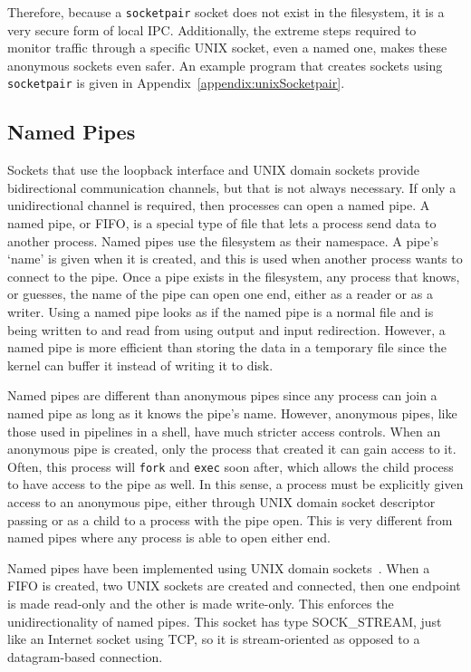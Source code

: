 Therefore, because a \texttt{socketpair} socket does not exist in the filesystem, it is a very secure form of local IPC.  Additionally, the extreme steps required to monitor traffic through a specific UNIX socket, even a named one, makes these anonymous sockets even safer.  An example program that creates sockets using \texttt{socketpair} is given in Appendix~\ref{appendix:unixSocketpair}.

\subsection{Named Pipes}
\label{sec:namedPipes}
Sockets that use the loopback interface and UNIX domain sockets provide bidirectional communication channels, but that is not always necessary.  If only a unidirectional channel is required, then processes can open a named pipe.  A named pipe, or FIFO, is a special type of file that lets a process send data to another process.  Named pipes use the filesystem as their namespace.  A pipe's `name' is given when it is created, and this is used when another process wants to connect to the pipe.  Once a pipe exists in the filesystem, any process that knows, or guesses, the name of the pipe can open one end, either as a reader or as a writer.  Using a named pipe looks as if the named pipe is a normal file and is being written to and read from using output and input redirection.  However, a named pipe is more efficient than storing the data in a temporary file since the kernel can buffer it instead of writing it to disk.

Named pipes are different than anonymous pipes since any process can join a named pipe as long as it knows the pipe's name.  However, anonymous pipes, like those used in pipelines in a shell, have much stricter access controls.  When an anonymous pipe is created, only the process that created it can gain access to it.  Often, this process will \texttt{fork} and \texttt{exec} soon after, which allows the child process to have access to the pipe as well.  In this sense, a process must be explicitly given access to an anonymous pipe, either through UNIX domain socket descriptor passing or as a child to a process with the pipe open.  This is very different from named pipes where any process is able to open either end.

Named pipes have been implemented using UNIX domain sockets~\cite[p 1147]{singh2006mac}.  When a FIFO is created, two UNIX sockets are created and connected, then one endpoint is made read-only and the other is made write-only.  This enforces the unidirectionality of named pipes.  This socket has type SOCK\_STREAM, just like an Internet socket using TCP, so it is stream-oriented as opposed to a datagram-based connection.


